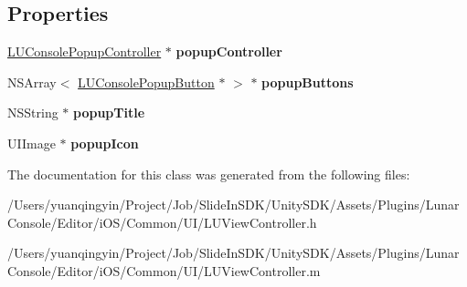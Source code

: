 \subsection*{Properties}
\begin{DoxyCompactItemize}
\item 
\mbox{\label{interface_l_u_view_controller_a837ab759018c7544886bef9fecaae3ee}} 
\mbox{\hyperlink{interface_l_u_console_popup_controller}{L\+U\+Console\+Popup\+Controller}} $\ast$ {\bfseries popup\+Controller}
\item 
\mbox{\label{interface_l_u_view_controller_a063b2a022d67d8882345eb5b412635d8}} 
N\+S\+Array$<$ \mbox{\hyperlink{interface_l_u_console_popup_button}{L\+U\+Console\+Popup\+Button}} $\ast$ $>$ $\ast$ {\bfseries popup\+Buttons}
\item 
\mbox{\label{interface_l_u_view_controller_a09c5ab3f0f21b9c705456c08b0abee16}} 
N\+S\+String $\ast$ {\bfseries popup\+Title}
\item 
\mbox{\label{interface_l_u_view_controller_a0eae59362da03b09e87ff185707ded25}} 
U\+I\+Image $\ast$ {\bfseries popup\+Icon}
\end{DoxyCompactItemize}


The documentation for this class was generated from the following files\+:\begin{DoxyCompactItemize}
\item 
/\+Users/yuanqingyin/\+Project/\+Job/\+Slide\+In\+S\+D\+K/\+Unity\+S\+D\+K/\+Assets/\+Plugins/\+Lunar\+Console/\+Editor/i\+O\+S/\+Common/\+U\+I/L\+U\+View\+Controller.\+h\item 
/\+Users/yuanqingyin/\+Project/\+Job/\+Slide\+In\+S\+D\+K/\+Unity\+S\+D\+K/\+Assets/\+Plugins/\+Lunar\+Console/\+Editor/i\+O\+S/\+Common/\+U\+I/L\+U\+View\+Controller.\+m\end{DoxyCompactItemize}
